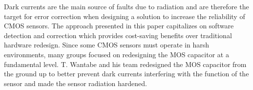\par Dark currents are the main source of faults due to radiation and are therefore the target for error correction when designing a solution to increase the reliability of CMOS sensors. The approach presented in this paper capitalizes on software detection and correction which provides cost-saving benefits over traditional hardware redesign. Since some CMOS sensors must operate in harsh environments, many groups focused on redesigning the MOS capacitor at a fundamental level. T. Wantabe and his team redesigned the MOS capacitor from the ground up \cite{wantabe_takeuchi_ozawa_akahori_tsuchiya_2017} to better prevent dark currents interfering with the function of the sensor and made the sensor radiation hardened.